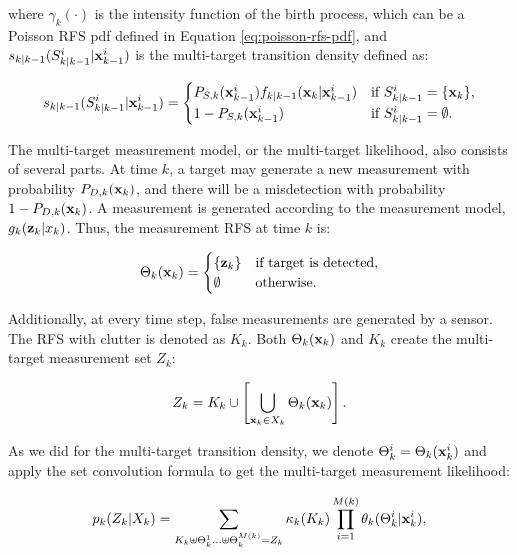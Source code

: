 \noindent where $\gamma_k(\cdot)$ is the intensity function of the birth process, which can be a Poisson RFS pdf defined in Equation \ref{eq:poisson-rfs-pdf}, and $s_{k|k-1}(S_{k|k-1}^i | \svecat{x}{k-1}{i})$ is the multi-target transition density defined as:

\begin{equation}
    s_{k|k-1}(S_{k|k-1}^i | \svecat{x}{k-1}{i}) = \begin{cases}
        P_{S,k}(\svecat{x}{k-1}{i})
            f_{k|k-1}(\vecat{x}{k} | \svecat{x}{k-1}{i}) & \text{if } S_{k|k-1}^i = \{\vecat{x}{k}\}, \\
            1 - P_{S,k}(\svecat{x}{k-1}{i}) & \text{if } S_{k|k-1}^i = \emptyset.
    \end{cases}
\end{equation}

The multi-target measurement model, or the multi-target likelihood, also consists of several parts. At time $k$, a target may generate a new measurement with probability $P_{D,k}(\vecat{x}{k})$, and there will be a misdetection with probability $1 - P_{D,k}(\vecat{x}{k})$. A measurement is generated according to the measurement model, $g_{k}(\vecat{z}{k} | x_{k})$. Thus, the measurement RFS at time $k$ is:

\begin{equation}
    \Theta_k(\vecat{x}{k}) = \begin{cases}
        \{\vecat{z}{k}\} & \text{if target is detected}, \\
        \emptyset & \text{otherwise}.
    \end{cases}
\end{equation}

Additionally, at every time step, false measurements are generated by a sensor. The RFS with clutter is denoted as $K_k$. Both $\Theta_k(\vecat{x}{k})$ and $K_k$ create the multi-target measurement set $Z_k$:

\begin{equation}
    Z_k = K_k \cup \left[ \bigcup_{\vecat{x}{k} \in X_k} \Theta_k(\vecat{x}{k}) \right].
\end{equation}

As we did for the multi-target transition density, we denote $\Theta_k^i = \Theta_k(\svecat{x}{k}{i})$ and apply the set convolution formula to get the multi-target measurement likelihood:

\begin{equation}\label{eq:mt-meas-likelihood}
    p_k(Z_k | X_k) = \sum_{
        K_k \uplus \Theta_{k}^1 \ldots \uplus \Theta_{k}^{M(k)} = Z_{k}
    }
    \kappa_k(K_k)
    \prod_{i=1}^{M(k)}
    \theta_{k}(\Theta_{k}^i | \svecat{x}{k}{i}),
\end{equation}


